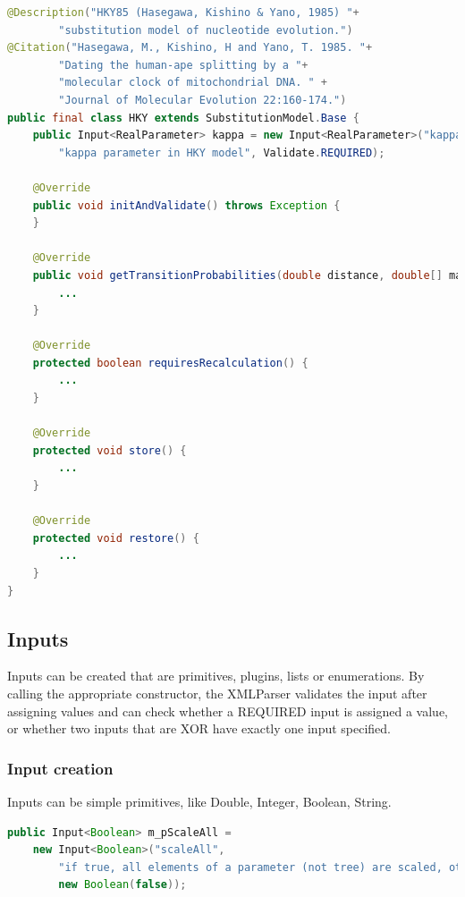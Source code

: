 \documentclass{article}
\begin{document}
{\color{blue}\begin{lstlisting}[language=java]
@Description("HKY85 (Hasegawa, Kishino & Yano, 1985) "+
        "substitution model of nucleotide evolution.")
@Citation("Hasegawa, M., Kishino, H and Yano, T. 1985. "+
        "Dating the human-ape splitting by a "+ 
        "molecular clock of mitochondrial DNA. " +
        "Journal of Molecular Evolution 22:160-174.")
public final class HKY extends SubstitutionModel.Base {
    public Input<RealParameter> kappa = new Input<RealParameter>("kappa", 
        "kappa parameter in HKY model", Validate.REQUIRED);

    @Override
    public void initAndValidate() throws Exception {
    }

    @Override
    public void getTransitionProbabilities(double distance, double[] matrix) {
        ...
    }

    @Override
    protected boolean requiresRecalculation() {
        ...
    }

    @Override
    protected void store() {
        ...
    }

    @Override
    protected void restore() {
        ...
    }
}
\end{lstlisting}}



\subsection{Inputs\label{ssec.input}}

Inputs can be created that are primitives, plugins, lists or enumerations.
By calling the appropriate constructor, the XMLParser validates the input
after assigning values and can check whether a REQUIRED input is assigned
a value, or whether two inputs that are XOR have exactly one input specified.


\subsubsection{Input creation}
Inputs can be simple primitives, like Double, Integer, Boolean, String.


{\color{blue}\begin{lstlisting}[language=java]
public Input<Boolean> m_pScaleAll = 
    new Input<Boolean>("scaleAll", 
        "if true, all elements of a parameter (not tree) are scaled, otherwise one is randomly selected",
        new Boolean(false));
\end{lstlisting}}
\end{document}
